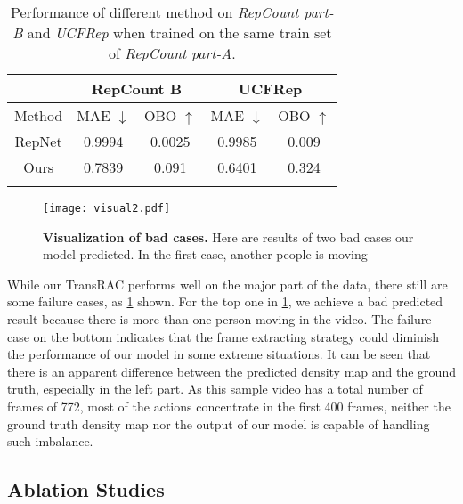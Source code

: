 \documentclass[10pt,twocolumn,letterpaper]{article}
\begin{document}
\begin{table}[ht]
	\centering
	\begin{tabular}{c|c|c|c|c}
		\hline

		                     & \multicolumn{2}{c|}{RepCount B} & \multicolumn{2}{c}{UCFRep}                                         \\
		\hline
		Method               & MAE  $\downarrow$               & OBO  $\uparrow$            & MAE $\downarrow$     & OBO $\uparrow$ \\
		\hline
		RepNet \cite{RepNet} & 0.9994                          & 0.0025                     & 0.9985               & 0.009          \\
		Ours                 & 0.7839                          & 0.091                     & 0.6401               & 0.324          \\
		\hline
		\multicolumn{1}{c}{} & \multicolumn{1}{c}{}            & \multicolumn{1}{c}{}       & \multicolumn{1}{c}{} &
	\end{tabular}
	\caption{
		Performance of different method on \emph{RepCount part-B} and \emph{UCFRep} when trained on the same train set of \emph{RepCount part-A}.
	}
	\label{tab:B+UCF}

\end{table}

\begin{figure}[ht]
\centering

\centerline{\texttt{[image: visual2.pdf]}}\caption{
\textbf{Visualization of bad cases.} Here are  results of two bad cases our model predicted. In the first case, another people is moving}
\label{fig:badcase}
\end{figure}
While our TransRAC performs well on the major part of the data, there still are some failure cases, as \cref{fig:badcase} shown. For the top one in \cref{fig:badcase}, we achieve a bad predicted result because there is more than one person  moving in the video. The failure case on the bottom indicates that the frame extracting strategy could diminish the performance of our model in some extreme situations. It can be seen that there is an apparent difference between the predicted density map and the ground truth, especially in the left part. As this sample video has a total number of frames of 772, most of the actions concentrate in the first 400 frames, neither the ground truth density map nor the output of our model is capable of handling such imbalance. 


\subsection{Ablation Studies}
\end{document}
